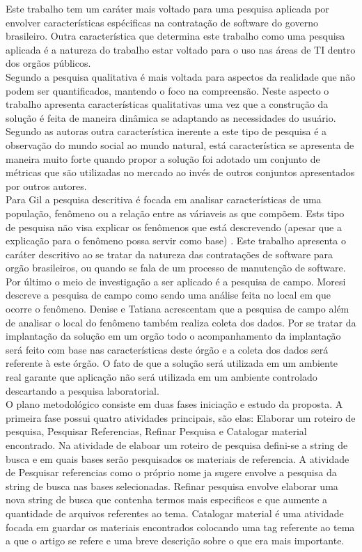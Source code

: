 Este trabalho tem um caráter mais voltado para uma pesquisa aplicada por envolver características espécificas na contratação de software do governo brasileiro. Outra característica que determina este trabalho como uma pesquisa aplicada é a natureza do trabalho estar voltado para o uso nas áreas de TI dentro dos orgãos públicos.
\\Segundo \cite{tatiana_denise} a pesquisa qualitativa é mais voltada para aspectos da realidade que não podem ser quantificados, mantendo o foco na compreensão. Neste aspecto o trabalho apresenta características qualitativas uma vez que a construção da solução é feita de maneira dinâmica se adaptando as necessidades do usuário. Segundo as autoras outra característica inerente a este tipo de pesquisa é a observação do mundo social ao mundo natural, está característica se apresenta de maneira muito forte quando propor a solução foi adotado um conjunto de métricas que são utilizadas no mercado ao invés de outros conjuntos apresentados por outros autores. 
\\Para Gil \cite{gil_como_2002} a pesquisa descritiva é focada em analisar características de uma população, fenômeno ou a relação entre as váriaveis as que compõem. Ests tipo de pesquisa não visa explicar os fenômenos que está descrevendo (apesar que a explicação para o fenômeno possa servir como base) \cite{moresi_metodologia_2003}. Este trabalho apresenta o caráter descritivo ao se tratar da natureza das contratações de software para orgão brasileiros, ou quando se fala de um processo de manutenção de software.
\\Por último o meio de investigação a ser aplicado é a pesquisa de campo. Moresi \cite{moresi_metodologia_2003} descreve a pesquisa de campo como sendo uma análise feita no local em que ocorre o fenômeno. Denise e Tatiana \cite{tatiana_denise} acrescentam que a pesquisa de campo além de analisar o local do fenômeno também realiza coleta dos dados. Por se tratar da implantação da solução em um orgão todo o acompanhamento da implantação será feito com base nas características deste órgão e a coleta dos dados será referente à este órgão. O fato de que a solução será utilizada em um ambiente real garante que aplicação não será utilizada em um ambiente controlado descartando a pesquisa laboratorial.
\\O plano metodológico consiste em duas fases iniciação e estudo da proposta. A primeira fase possui quatro atividades principais, são elas: Elaborar um roteiro de pesquisa, Pesquisar Referencias, Refinar Pesquisa e Catalogar material encontrado. Na atividade de elaboar um roteiro de pesquisa defini-se a string de busca e em quais bases serão pesquisados os materiais de referencia. A atividade de Pesquisar referencias como o próprio nome ja sugere envolve a pesquisa da string de busca nas bases selecionadas. Refinar pesquisa envolve elaborar uma nova string de busca que contenha termos mais especificos e que aumente a quantidade de arquivos referentes ao tema. Catalogar material é uma atividade focada em guardar os materiais encontrados colocando uma tag referente ao tema a que o artigo se refere e uma breve descrição sobre o que era mais importante. 
